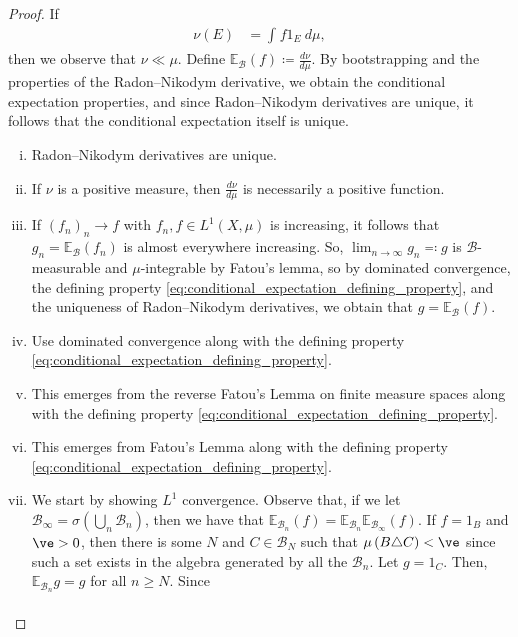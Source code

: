 \documentclass[10pt]{mypackage}
\renewcommand{\coloneq}{\coloneqq}
\renewcommand{\eqcolon}{\eqqcolon}
\begin{document}
\begin{proof}
  If
  \begin{align*}
    \nu(E) &= \int_{}^{} f 1_E\:d\mu,
  \end{align*}
  then we observe that $\nu\ll\mu$. Define $ \mathbb{E}_{\mathcal{B}}(f) \coloneq \frac{d\nu}{d\mu} $. By bootstrapping and the properties of the Radon--Nikodym derivative, we obtain the conditional expectation properties, and since Radon--Nikodym derivatives are unique, it follows that the conditional expectation itself is unique.
  \begin{enumerate}[(i)]
    \item Radon--Nikodym derivatives are unique.
    \item If $\nu$ is a positive measure, then $\frac{d\nu}{d\mu}$ is necessarily a positive function.
    \item If $\left( f_n \right)_n\to f$ with $f_n,f\in L^1\left( X,\mu \right)$ is increasing, it follows that $g_n = \mathbb{E}_{\mathcal{B}}\left( f_n \right)$ is almost everywhere increasing. So, $\lim_{n\to\infty}g_n\eqcolon g$ is $\mathcal{B}$-measurable and $\mu$-integrable by Fatou's lemma, so by dominated convergence, the defining property \eqref{eq:conditional_expectation_defining_property}, and the uniqueness of Radon--Nikodym derivatives, we obtain that $g = \mathbb{E}_{\mathcal{B}}\left( f \right)$.
    \item Use dominated convergence along with the defining property \eqref{eq:conditional_expectation_defining_property}.
    \item This emerges from the reverse Fatou's Lemma on finite measure spaces along with the defining property \eqref{eq:conditional_expectation_defining_property}.
    \item This emerges from Fatou's Lemma along with the defining property \eqref{eq:conditional_expectation_defining_property}.
    \item We start by showing $L^1$ convergence. Observe that, if we let $\mathcal{B}_{\infty} = \sigma\left( \bigcup_{n}\mathcal{B}_n \right)$, then we have that $ \mathbb{E}_{\mathcal{B}_{n}}\left( f \right) = \mathbb{E}_{\mathcal{B}_{n}} \mathbb{E}_{\mathcal{B}_{\infty}}\left( f \right)$. If $f = 1_B$ and $\ve > 0$, then there is some $N$ and $C\in \mathcal{B}_N$ such that $\mu\left( B\triangle C \right) < \ve$ since such a set exists in the algebra generated by all the $\mathcal{B}_n$. Let $g = 1_C$. Then, $ \mathbb{E}_{\mathcal{B}_n}g = g $ for all $n\geq N$. Since
      \begin{align*}

\end{align*}
\end{enumerate}
\end{proof}
\end{document}
